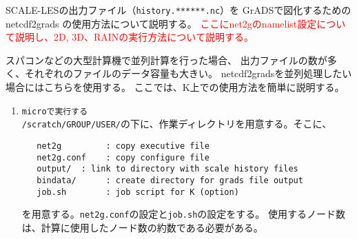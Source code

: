 %


SCALE-LESの出力ファイル（\verb|history.******.nc|）を
GrADSで図化するためのnetcdf2grads の使用方法について説明する。
\textcolor{red}{\large ここにnet2gのnamelist設定について説明し、2D, 3D、RAINの実行方法について説明する。}


スパコンなどの大型計算機で並列計算を行った場合、
出力ファイルの数が多く、それぞれのファイルのデータ容量も大きい。
netcdf2gradsを並列処理したい場合にはこちらを使用する。
ここでは、K上での使用方法を簡単に説明する。

\begin{enumerate}
\item \verb|microで実行する| \\
 \verb|/scratch/GROUP/USER/|の下に、作業ディレクトリを用意する。そこに、
 \begin{verbatim}
   net2g         : copy executive file
   net2g.conf    : copy configure file
   output/  : link to directory with scale history files
   bindata/      : create directory for grads file output
   job.sh        : job script for K (option)
 \end{verbatim}
 を用意する。\verb|net2g.conf|の設定と\verb|job.sh|の設定をする。
 使用するノード数は、計算に使用したノード数の約数である必要がある。
\end{enumerate}





